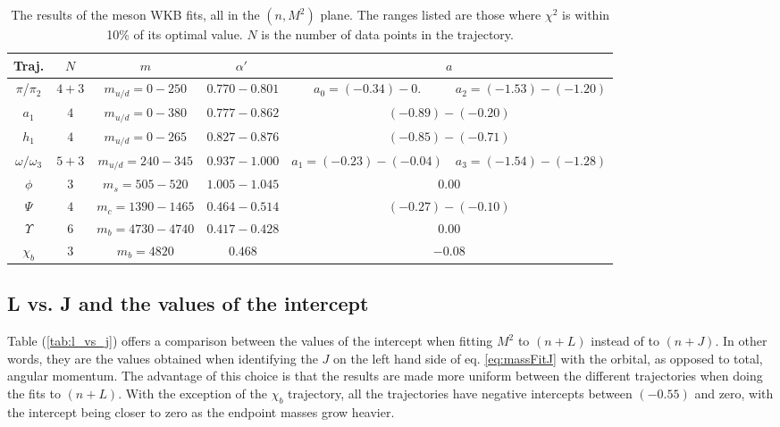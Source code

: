 \documentclass[11pt,a4]{article}
\newcommand{\alp}{\ensuremath{\alpha'\:}}
\newcommand{\mud}{m_{u/d}}
\begin{document}
				\begin{table}[tp!] \centering
					\begin{tabular}{|c|c|c|c|cc|} \hline
					Traj. & \(N\) & \(m\) & \alp & \multicolumn{2}{|c|}{\(a\)} \\ \hline
					
					\(\pi\)/\(\pi_2\) & \(4+3\) & \(\mud = 0-250\) & \(0.770-0.801\) & \(a_0 = (-0.34)-0.\) & \(a_2 = (-1.53)-(-1.20)\) \\
					
					\(a_1\) & \(4\) & \(\mud = 0-380\) & \(0.777-0.862\) & \multicolumn{2}{|c|}{\((-0.89)-(-0.20)\)} \\
					
					\(h_1\) & \(4\) & \(\mud = 0-265\) & \(0.827-0.876\) & \multicolumn{2}{|c|}{\((-0.85)-(-0.71)\)} \\
					
					\(\omega/\omega_3\) & \(5+3\) & \(\mud = 240-345\) & \(0.937-1.000\) & \(a_1 = (-0.23)-(-0.04)\) & \(a_3 = (-1.54)-(-1.28)\) \\
					
					\(\phi\) & \(3\) & \(m_s = 505-520 \) & \(1.005-1.045\) & \multicolumn{2}{|c|}{\(0.00\)} \\
					
					\(\Psi\) & \(4\) & \(m_c = 1390-1465\) & \(0.464-0.514\) & \multicolumn{2}{|c|}{\((-0.27)-(-0.10)\)} \\
					
					\(\Upsilon\) & \(6\) & \(m_b = 4730-4740\) & \(0.417-0.428\) & \multicolumn{2}{|c|}{\(0.00\)} \\
					
					\(\chi_b\) & \(3\) & \(m_b = 4820\) & \(0.468\) & \multicolumn{2}{|c|}{\(-0.08\)} \\ \hline \end{tabular}

					\caption{\label{tab:mes_w} The results of the meson WKB fits, all in the \((n,M^2)\) plane. The ranges listed are those where \(\chi^2\) is within 10\% of its optimal value. \(N\) is the number of data points in the trajectory.}
				\end{table} \clearpage
				
\subsection{L vs. J and the values of the intercept}
Table (\ref{tab:l_vs_j}) offers a comparison between the values of the intercept when fitting \(M^2\) to \((n + L)\) instead of to \((n + J)\). In other words, they are the values obtained when identifying the \(J\) on the left hand side of eq. \eqref{eq:massFitJ} with the orbital, as opposed to total, angular momentum. The advantage of this choice is that the results are made more uniform between the different trajectories when doing the fits to \((n+L)\). With the exception of the \(\chi_b\) trajectory, all the trajectories have negative intercepts between \((-0.55)\) and zero, with the intercept being closer to zero as the endpoint masses grow heavier.
\end{document}
